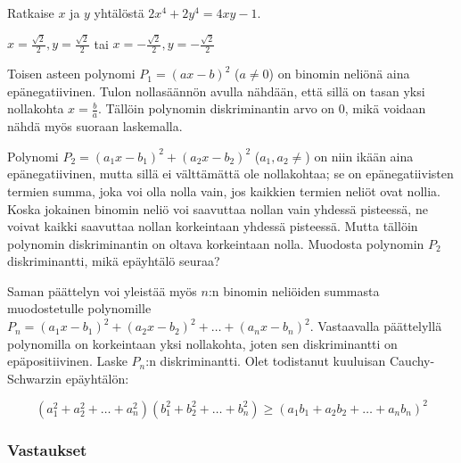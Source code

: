 \begin{tehtava} %
    Ratkaise $x$ ja $y$ yhtälöstä $2x^4+2y^4=4xy-1$. %
    \begin{vastaus}
        $x=\frac{\sqrt{2}}{2}, y=\frac{\sqrt{2}}{2}$ tai $x=-\frac{\sqrt{2}}{2}, y=-\frac{\sqrt{2}}{2}$
    \end{vastaus}
\end{tehtava}

\begin{tehtava} %
Toisen asteen polynomi $P_1 = (ax-b)^2$ ($a \neq 0 $) on binomin neliönä aina epänegatiivinen. Tulon nollasäännön avulla nähdään, että sillä on tasan yksi nollakohta $x = \frac{b}{a}$. Tällöin polynomin diskriminantin arvo on 0, mikä voidaan nähdä myös suoraan laskemalla.

Polynomi $P_2 = (a_1x-b_1)^2+(a_2x-b_2)^2$ ($a_1,a_2 \neq $) on niin ikään aina epänegatiivinen, mutta sillä ei välttämättä ole nollakohtaa; se on epänegatiivisten termien summa, joka voi olla nolla vain, jos kaikkien termien neliöt ovat nollia. Koska jokainen binomin neliö voi saavuttaa nollan vain yhdessä pisteessä, ne voivat kaikki saavuttaa nollan korkeintaan yhdessä pisteessä. Mutta tällöin polynomin diskriminantin on oltava korkeintaan nolla. Muodosta polynomin $P_2$ diskriminantti, mikä epäyhtälö seuraa?

Saman päättelyn voi yleistää myös $n$:n binomin neliöiden summasta muodostetulle polynomille $P_n = (a_1x-b_1)^2+(a_2x-b_2)^2+\ldots+(a_nx-b_n)^2$. Vastaavalla päättelyllä polynomilla on korkeintaan yksi nollakohta, joten sen diskriminantti on epäpositiivinen. Laske $P_n$:n diskriminantti. Olet todistanut kuuluisan Cauchy-Schwarzin epäyhtälön:

\[
(a_1^2+a_2^2+\ldots+a_n^2)(b_1^2+b_2^2+\ldots+b_n^2) \geq (a_1b_1+a_2b_2+\ldots+a_nb_n)^2
\]




\end{tehtava}


\subsubsection*{Vastaukset}


